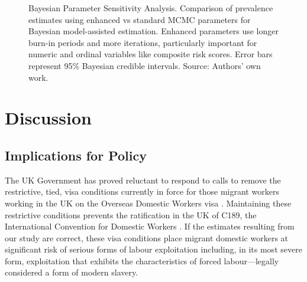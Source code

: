 \documentclass[
  12pt,
  letterpaper,
  DIV=11,
  numbers=noendperiod]{scrartcl}
\theoremstyle{plain}
\theoremstyle{definition}
\begin{document}
\begin{figure}[H]


\caption{\label{fig-parameter-comparison}Bayesian Parameter Sensitivity
Analysis. Comparison of prevalence estimates using enhanced vs standard
MCMC parameters for Bayesian model-assisted estimation. Enhanced
parameters use longer burn-in periods and more iterations, particularly
important for numeric and ordinal variables like composite risk scores.
Error bars represent 95\% Bayesian credible intervals. Source: Authors'
own work.}

\end{figure}%

\section{Discussion}\label{discussion}

\subsection{Implications for Policy}\label{implications-for-policy}

The UK Government has proved reluctant to respond to calls to remove the
restrictive, tied, visa conditions currently in force for those migrant
workers working in the UK on the Overseas Domestic Workers visa
\autocite{gower_calls_2016}. Maintaining these restrictive conditions
prevents the ratification in the UK of C189, the International
Convention for Domestic Workers \autocite{ILO11-indicators}. If the
estimates resulting from our study are correct, these visa conditions
place migrant domestic workers at significant risk of serious forms of
labour exploitation including, in its most severe form, exploitation
that exhibits the characteristics of forced labour---legally considered
a form of modern slavery.
\end{document}
